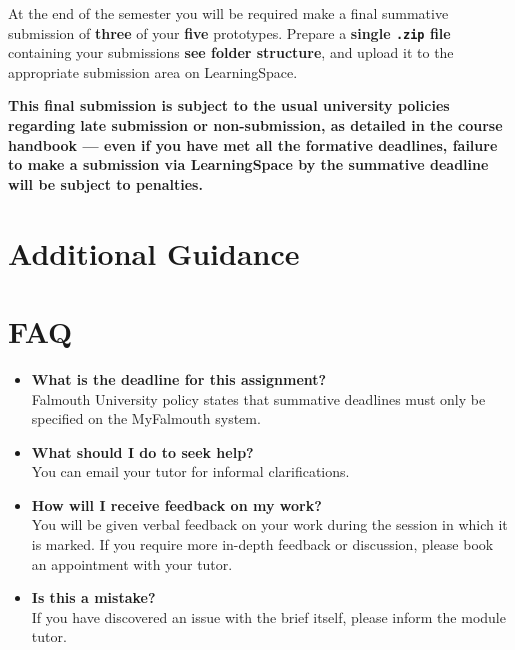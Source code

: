 \documentclass{../../fal_assignment}
\begin{document}
At the end of the semester you will be required make a final summative submission of \textbf{three} of your \textbf{five} prototypes. 
Prepare a \textbf{single \texttt{.zip} file} containing your submissions \textbf{see folder structure}, and upload it to the appropriate submission area on LearningSpace.

\textbf{This final submission is subject to the usual university policies regarding late submission or non-submission,
as detailed in the course handbook ---
even if you have met all the formative deadlines,
failure to make a submission via LearningSpace by the summative deadline will be subject to penalties.}

\section*{Additional Guidance}



\section*{FAQ}

\begin{itemize}
	\item 	\textbf{What is the deadline for this assignment?} \\ 
    		Falmouth University policy states that summative deadlines must only be specified on the MyFalmouth system.
    		
	\item 	\textbf{What should I do to seek help?} \\ 
    		You can email your tutor for informal clarifications.  
    		
	\item 	\textbf{How will I receive feedback on my work?} \\ 
    		You will be given verbal feedback on your work during the session in which it is marked.
    		If you require more in-depth feedback or discussion, please book an appointment with your tutor.
    		
    	\item 	\textbf{Is this a mistake?} \\ 	
    		If you have discovered an issue with the brief itself, please inform the module tutor.
\end{itemize}
\end{document}
